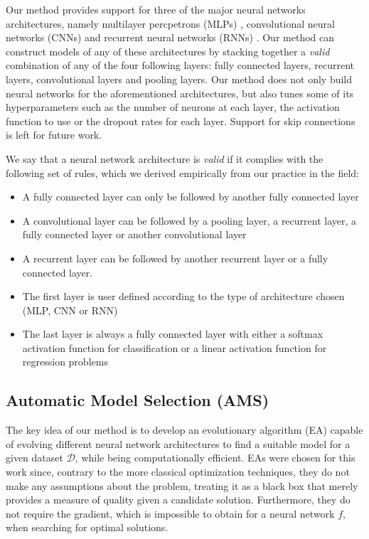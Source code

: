 \documentclass[journal]{IEEEtran}
\begin{document}
Our method provides support for three of the major neural networks architectures, namely multilayer percpetrons (MLPs) \cite{Engelbrecht2007}, convolutional neural networks (CNNs) \cite{imagenet_cvpr09} and recurrent neural networks (RNNs) \cite{dblp_lipton_2015}. Our method can construct models of any of these architectures by stacking together a \textit{valid} combination of any of the four following layers: fully connected layers, recurrent layers, convolutional layers and pooling layers. Our method does not only build neural networks for the aforementioned architectures, but also tunes some of its hyperparameters such as the number of neurons at each layer, the activation function to use or the dropout rates for each layer. Support for skip connections is left for future work.

We say that a neural network architecture is \textit{valid} if it complies with the following set of rules, which we derived empirically from our practice in the field:

\begin{itemize}
\item A fully connected layer can only be followed by another fully connected layer
\item A convolutional layer can be followed by a pooling layer, a recurrent layer, a fully connected layer or another convolutional layer
\item A recurrent layer can be followed by another recurrent layer or a fully connected layer.
\item The first layer is user defined according to the type of architecture chosen (MLP, CNN or RNN)
\item The last layer is always a fully connected layer with either a softmax activation function for classification or a linear activation function for regression problems
\end{itemize}


\subsection{Automatic Model Selection (AMS)}

The key idea of our method is to develop an evolutionary algorithm (EA) capable of evolving different neural network architectures to find a suitable model for a given dataset $\mathcal{D}$, while being computationally efficient. EAs were chosen for this work since, contrary to the more classical optimization techniques, they do not make any assumptions about the problem, treating it as a black box that merely provides a measure of quality given a candidate solution.  Furthermore, they do not require the gradient, which is impossible to obtain for a neural network $f,$ when searching for optimal solutions.
\end{document}
